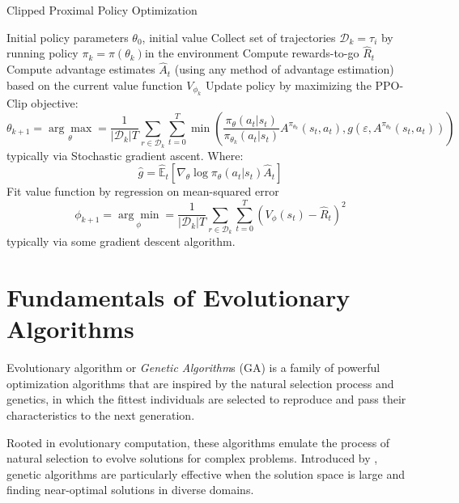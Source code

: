 \begin{algorithm}[H]
    \caption{Clipped Proximal Policy Optimization}
    \label{alg:ppo}
    \begin{algorithmic}[1]
        \Require Initial policy parameters $\theta _0$, initial value
        \State Collect set of trajectories $\mathcal{D} _k = \tau _i$ by running policy $\pi _k = \pi(\theta _k)$in the environment
        \State Compute rewards-to-go $\hat{R} _t$
        \State Compute advantage estimates $\hat{A} _t$
        (using any method of advantage estimation) based on the current value function $V _{\phi _k}$
        \State Update policy by maximizing the PPO-Clip objective:
        $$
            \theta _{k + 1} = \underset{\theta}{\arg\max} = \frac{1}{|\mathcal{D} _k|T} \sum _{r \in \mathcal{D} _k} \sum _{t = 0} ^{T} \min \left( \frac{\pi _{\theta} (a _t | s _t)}{\pi _{\theta_k} (a _t | s _t)} A ^{\pi _{\theta_k}} (s _t, a _t), g(\varepsilon, A ^{\pi _{\theta_k}}(s _t, a _t)) \right)
        $$
        typically via Stochastic gradient ascent. Where:
        $$
            \hat{g} = \hat{\mathbb{E}} _t \left[\nabla _{\theta}\log\pi _{\theta}(a _t | s _t) \hat{A} _t\right]
        $$
        \State Fit value function by regression on mean-squared error
        $$
            \phi _{k + 1} = \underset{\phi}{\arg\min} = \frac{1}{|\mathcal{D} _k|T} \sum _{r \in \mathcal{D} _k} \sum _{t = 0} ^{T} \left(V _{\phi}(s _t) - \hat{R} _t \right)^2
        $$
        typically via some gradient descent algorithm.
        \EndFor
    \end{algorithmic}
\end{algorithm}

\section{Fundamentals of Evolutionary Algorithms}

Evolutionary algorithm or \textit{Genetic Algorithm}s (\ac{GA}) is a family of powerful optimization algorithms that are inspired by the natural selection
process and genetics, in which the fittest individuals are selected to reproduce and pass their characteristics to the next generation.

Rooted in evolutionary computation, these algorithms emulate the process of natural selection to evolve solutions for complex problems. Introduced by \citet{holland_1992_ga}, genetic algorithms are particularly effective when the solution space is large and finding near-optimal solutions in diverse domains.

